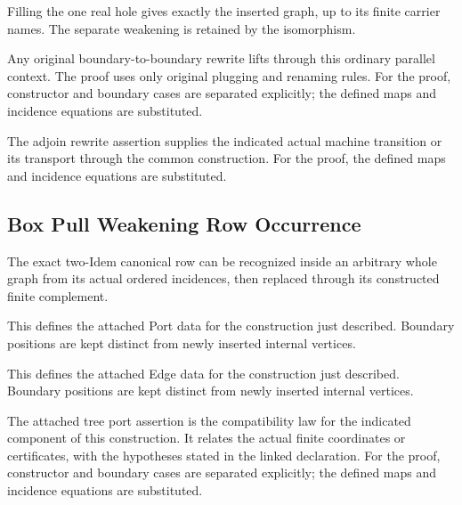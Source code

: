 Filling the one real hole gives exactly the inserted graph, up to its finite carrier names. The separate weakening is retained by the isomorphism.
\par{}

Any original boundary-to-boundary rewrite lifts through this ordinary parallel context. The proof uses only original plugging and renaming rules.
For the proof, constructor and boundary cases are separated explicitly; the defined maps and incidence equations are substituted.
\par{}

The adjoin rewrite assertion supplies the indicated actual machine transition or its transport through the common construction.
For the proof, the defined maps and incidence equations are substituted.
\par{}

\subsection{Box Pull Weakening Row Occurrence}
The exact two-Idem canonical row can be recognized inside an arbitrary whole graph from its actual ordered incidences, then replaced through its constructed finite complement.

This defines the attached Port data for the construction just described. Boundary positions are kept distinct from newly inserted internal vertices.
\par{}

This defines the attached Edge data for the construction just described. Boundary positions are kept distinct from newly inserted internal vertices.
\par{}

The attached tree port assertion is the compatibility law for the indicated component of this construction. It relates the actual finite coordinates or certificates, with the hypotheses stated in the linked declaration.
For the proof, constructor and boundary cases are separated explicitly; the defined maps and incidence equations are substituted.
\par{}

